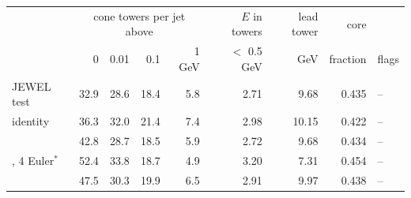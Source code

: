 \scriptsize
\setlength{\tabcolsep}{3pt}
\begin{tabular}{lrrrrrrrl}
\toprule
 & \multicolumn{4}{c}{cone towers per jet above} & $E$ in towers & lead tower & core & \\
 & 0 & 0.01 & 0.1 & 1 GeV & $<$ 0.5 GeV & GeV & fraction & flags \\
\midrule
JEWEL test & 32.9 & 28.6 & 18.4 & 5.8 & 2.71 & 9.68 & 0.435 & -- \\
identity & 36.3 & 32.0 & 21.4 & 7.4 & 2.98 & 10.15 & 0.422 & -- \\
\ot{} & 42.8 & 28.7 & 18.5 & 5.9 & 2.72 & 9.68 & 0.434 & -- \\
\ot{}, 4 Euler$^\ast$ & 52.4 & 33.8 & 18.7 & 4.9 & 3.20 & 7.31 & 0.454 & -- \\
\dsbm{} & 47.5 & 30.3 & 19.9 & 6.5 & 2.91 & 9.97 & 0.438 & -- \\
\bottomrule
\end{tabular}
